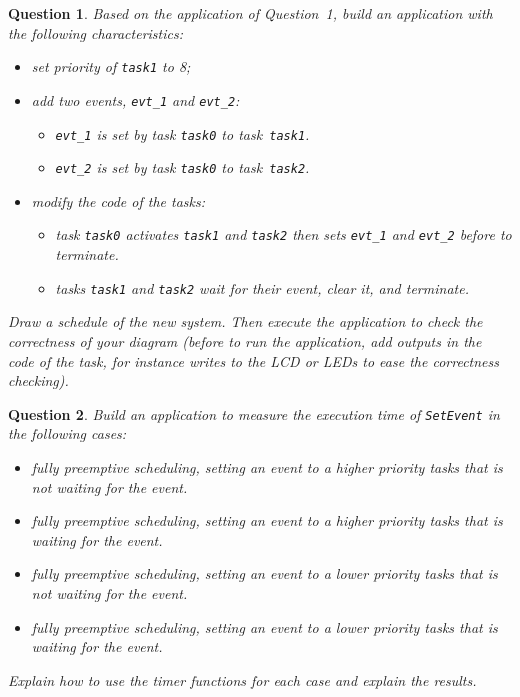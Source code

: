 \documentclass[11pt]{report}
\newtheorem{ex}{Question}
\begin{document}
\begin{ex}
     Based on the application of Question~1, build an application with the following characteristics:
\begin{itemize}
    \item set priority of \texttt{task1} to 8;
    \item add two events, \texttt{evt\_1} and \texttt{evt\_2}:
        \begin{itemize}
            \item \texttt{evt\_1} is set by task \texttt{task0} to task \texttt{task1}.
            \item \texttt{evt\_2} is set by task \texttt{task0} to task \texttt{task2}.
        \end{itemize}
    \item modify the code of the tasks:
        \begin{itemize}
            \item task \texttt{task0} activates \texttt{task1} and \texttt{task2} then sets \texttt{evt\_1} and \texttt{evt\_2} before to terminate.
            \item tasks \texttt{task1} and \texttt{task2} wait for their event, clear it, and terminate.
        \end{itemize}
\end{itemize}

Draw a schedule of the new system.
Then execute the application to check the correctness of your diagram (before to run the application, add outputs in the code of the task, for instance writes to the LCD or LEDs to ease the correctness checking).

\end{ex}

\begin{ex}
    Build an application to measure the execution time of \texttt{SetEvent} in the following cases:
    \begin{itemize}
        \item fully preemptive scheduling, setting an event to a higher priority tasks that is not waiting for the event.
        \item fully preemptive scheduling, setting an event to a higher priority tasks that is waiting for the event.
        \item fully preemptive scheduling, setting an event to a lower priority tasks that is not waiting for the event.
        \item fully preemptive scheduling, setting an event to a lower priority tasks that is waiting for the event.
    \end{itemize}

    Explain how to use the timer functions for each case and explain the results.
\end{ex}
\end{document}
